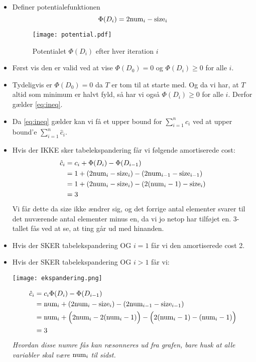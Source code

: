 \begin{itemize}
\begin{itemize}
	\item Definer potentialefunktionen
	$$
	\Phi(D_i) = 2 {\textrm{num} }_i - {\textrm{size} }_i
	$$
	\begin{figure}[H]
		\begin{center}
			\texttt{[image: potential.pdf]}
		\end{center}
		\caption{Potentialet $\Phi(D_i)$ efter hver iteration $i$}
		\label{fig:pot}
	\end{figure}
	\item Først vis den er valid ved at vise $\Phi(D_0) = 0$ og $\Phi(D_i) \geq 0$ for alle $i$.
	\item Tydeligvis er $\Phi(D_0) = 0$ da $T$ er tom til at starte med. Og da vi har, at $T$ altid som minimum er halvt fyld, så har vi også $\Phi(D_i) \geq 0$ for alle $i$. Derfor gælder \cref{eq:ineq}.
	\item Da \cref{eq:ineq} gælder kan vi få et upper bound for $\sum_{i=1}^n c_i$ ved at upper bound'e $\sum_{i=1}^n \hat c_i$.
	\item Hvis der IKKE sker tabelekspandering får vi følgende amortiserede cost:\\
	\begin{align*}
	\hat c_i &= c_i + \Phi(D_i) - \Phi(D_{i-1})\\
	         &= 1 + (2 {\textrm{num} }_i - {\textrm{size} }_i) - (2 {\textrm{num} }_{i-1} - {\textrm{size} }_{i-1})\\
	         &= 1 + (2 {\textrm{num} }_i - {\textrm{size} }_i) - (2({\textrm{num} }_i - 1) - {\textrm{size} }_i)\\
	         &= 3
	\end{align*}
	Vi får dette da size ikke ændrer sig, og det forrige antal elementer svarer til det nuværende antal elementer minus en, da vi jo netop har tilføjet en. 3-tallet fås ved at se, at ting går ud med hinanden.
	\item Hvis der SKER tabelekspandering OG $i = 1$ får vi den amortiserede cost 2.
	\item Hvis der SKER tabelekspandering OG $i > 1$ får vi:
		\begin{center}
			\texttt{[image: ekspandering.png]}
		\end{center}
	\begin{align*}
	\hat c_i &= c_i \Phi(D_i) - \Phi(D_{i-1})\\
	         &= {\textrm{num} }_i + \left( 2{\textrm{num} }_i - {\textrm{size} }_i \right) - \left( 2{\textrm{num} }_{i-1} - {\textrm{size} }_{i-1} \right)\\
	         &= {\textrm{num} }_i + \Big( 2{\textrm{num} }_i - 2({\textrm{num} }_i - 1) \Big) - \Big( 2({\textrm{num} }_i - 1) - ({\textrm{num} }_i - 1) \Big)\\
	         &= 3
	\end{align*}
	\textit{Hvordan disse numre fås kan ræsonneres ud fra grafen, bare husk at alle variabler skal være} ${\textrm{num} }_i$ \textit{til sidst.}
\end{itemize}


\end{itemize}
